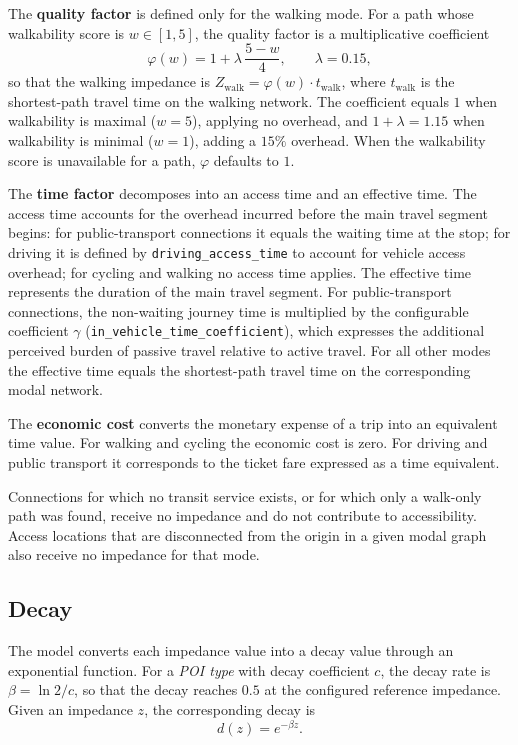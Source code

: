 \documentclass{article}
\begin{document}
The \textbf{quality factor} is defined only for the walking mode. For a path
whose walkability score is \(w \in [1,5]\), the quality factor is a
multiplicative coefficient
\begin{equation}
    \varphi(w) = 1 + \lambda\,\frac{5 - w}{4},
    \qquad \lambda = 0.15,
\end{equation}
so that the walking impedance is \(Z_{\text{walk}} = \varphi(w)\cdot
t_{\text{walk}}\), where \(t_{\text{walk}}\) is the shortest-path travel time
on the walking network. The coefficient equals \(1\) when walkability is
maximal (\(w = 5\)), applying no overhead, and \(1 + \lambda = 1.15\) when
walkability is minimal (\(w = 1\)), adding a \(15\%\) overhead. When the
walkability score is unavailable for a path, \(\varphi\) defaults to \(1\).

The \textbf{time factor} decomposes into an access time and an effective time.
The access time accounts for the overhead incurred before the main travel
segment begins: for public-transport connections it equals the waiting time at
the stop; for driving it is defined by \texttt{driving\_access\_time} to account for vehicle access
overhead; for cycling and walking no access time applies. The effective time
represents the duration of the main travel segment. For public-transport connections, the non-waiting journey time is multiplied by the configurable coefficient \(\gamma\)
(\texttt{in\_vehicle\_time\_coefficient}), which expresses the
additional perceived burden of passive travel relative to active travel. For all
other modes the effective time equals the shortest-path travel time on the
corresponding modal network.

The \textbf{economic cost} converts the monetary expense of a trip into an
equivalent time value. For walking and cycling the economic cost is zero. For
driving and public transport it corresponds to the ticket fare expressed as a
time equivalent.

Connections for which no transit service exists, or for which only a walk-only
path was found, receive no impedance and do not contribute to accessibility.
Access locations that are disconnected from the origin in a given modal graph
also receive no impedance for that mode.

\subsection{Decay}
The model converts each impedance value into a decay value through an
exponential function. For a \emph{POI type} with decay coefficient \(c\), the
decay rate is \(\beta = \ln 2 / c\), so that the decay reaches \(0.5\) at the
configured reference impedance. Given an impedance \(z\), the corresponding
decay is
\begin{equation}
    d(z) = e^{-\beta z}.
\end{equation}
\end{document}
